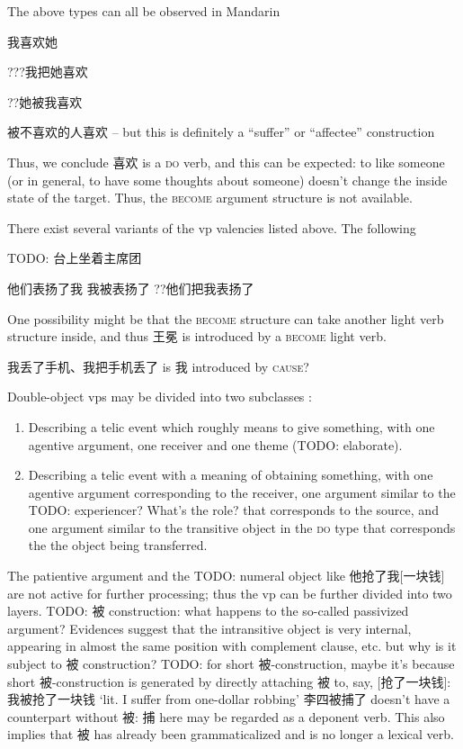\documentclass[UTF8, a4paper, oneside, scheme=plain]{ctexrep}
\newcommand*{\citesec}[1]{\S~{#1}}
\newcommand{\translate}[1]{`#1'}
\newcommand*{\category}[1]{\textsc{#1}}
\begin{document}
The above types can all be observed in Mandarin



我喜欢她

???我把她喜欢

??她被我喜欢

被不喜欢的人喜欢 -- but this is definitely a ``suffer'' or ``affectee'' construction

Thus, we conclude 喜欢 is a \category{do} verb, 
and this can be expected: 
to like someone (or in general, to have some thoughts about someone) 
doesn't change the inside state of the target.
Thus, the \category{become} argument structure is not available. 


There exist several variants of the \acs{vp} valencies listed above.
The following 

TODO: 台上坐着主席团

\begin{exe}
    \ex 他们表扬了我
    \ex 我被表扬了
    \ex ??他们把我表扬了
\end{exe}

One possibility might be that the \category{become} structure 
can take another light verb structure inside, 
and thus 王冕 is introduced by a \category{become} light verb.

我丢了手机、我把手机丢了 is 我 introduced by \category{cause}?

Double-object \acs{vp}s may be divided into 
two subclasses
\citep[\citesec{7.2}]{deng2010formal}:
\begin{enumerate}
    \item Describing a telic event which roughly means to give something, 
        with one agentive argument, 
        one receiver and one theme (TODO: elaborate).
    \item Describing a telic event with a meaning of obtaining something,
        with one agentive argument corresponding to the receiver, 
        one argument similar to the TODO: experiencer? What's the role? that corresponds to the source, 
        and one argument similar to the transitive object in the \category{do} type 
        that corresponds the the object being transferred.
\end{enumerate}

The patientive argument and the TODO: numeral object like 他抢了我[一块钱] 
are not active for further processing; 
thus the \acs{vp} can be further divided into two layers.
TODO: 被 construction: what happens to the so-called passivized argument?
Evidences suggest that the intransitive object is very internal, 
appearing in almost the same position with complement clause, etc.
but why is it subject to 被 construction? 
TODO: for short 被-construction, 
maybe it's because short 被-construction is generated by directly attaching 被 to, say, [抢了一块钱]: 
我被抢了一块钱 \translate{lit. I suffer from one-dollar robbing}
李四被捕了 doesn't have a counterpart without 被: 
捕 here may be regarded as a deponent verb. 
This also implies that 被 has already been grammaticalized 
and is no longer a lexical verb.
\end{document}
